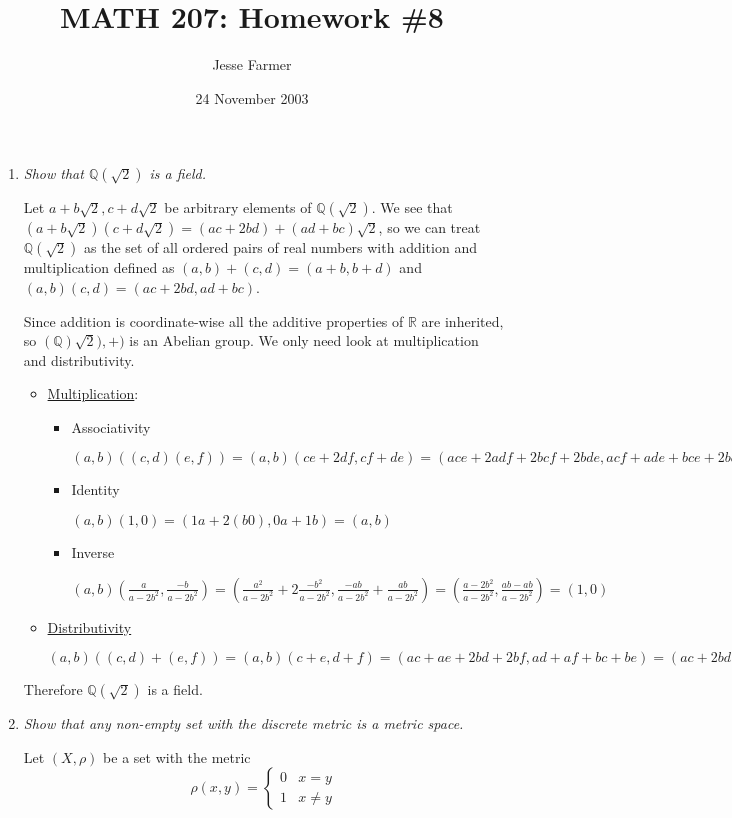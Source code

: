 \documentclass[11pt]{article}
\title{MATH 207: Homework \#8}
\author{Jesse Farmer}
\date{24 November 2003}
\begin{document}
\maketitle
\begin{enumerate}
\item \emph{Show that $\mathbb{Q}(\sqrt{2})$ is a field.}

Let $a+b\sqrt{2},c+d\sqrt{2}$ be arbitrary elements of $\mathbb{Q}(\sqrt{2})$.
We see that $(a+b\sqrt{2})(c+d\sqrt{2}) = (ac+2bd)+(ad+bc)\sqrt{2}$, so we can treat $\mathbb{Q}(\sqrt{2})$ as the set of all ordered pairs of real numbers with addition and multiplication defined as $(a,b)+(c,d) = (a+b,b+d)$ and $(a,b)(c,d) = (ac+2bd,ad+bc)$.

Since addition is coordinate-wise all the additive properties of $\mathbb{R}$ are inherited, so $(\mathbb{Q})\sqrt{2}),+)$ is an Abelian group.  We only need look at multiplication and distributivity.

\begin{itemize}
\item \underline{Multiplication}:
\begin{itemize}
\item Associativity

$(a,b)((c,d)(e,f))=(a,b)(ce+2df,cf+de)=(ace+2adf+2bcf+2bde,acf+ade+bce+2bdf)=(ac+2bd,ad+bc)(e,f)=((a,b)(c,d))(e,f)$

\item Identity

$(a,b)(1,0)=(1a + 2(b0),0a+1b)=(a,b)$

\item Inverse

$(a,b)(\frac{a}{a-2b^2},\frac{-b}{a-2b^2})=(\frac{a^2}{a-2b^2}+2\frac{-b^2}{a-2b^2}, \frac{-ab}{a-2b^2}+\frac{ab}{a-2b^2}) = (\frac{a-2b^2}{a-2b^2},\frac{ab-ab}{a-2b^2})=(1,0)$
\end{itemize}

\item \underline{Distributivity}

$(a,b)((c,d)+(e,f))=(a,b)(c+e,d+f)=(ac+ae+2bd+2bf,ad+af+bc+be)=(ac+2bd,ad+bc)+(ae+2bf,af+be)=(a,b)(c,d)+(a,b)(e,f)$
\end{itemize}

Therefore $\mathbb{Q}(\sqrt{2})$ is a field.

\item \emph{Show that any non-empty set with the discrete metric is a metric space.}

Let $(X,\rho)$ be a set with the metric
\[ \rho(x,y) = \left\{
              \begin{array}{ll}
                   0 & x = y\\
                   1 & x \neq y
              \end{array}
       \right.
\]


\end{enumerate}
\end{document}
